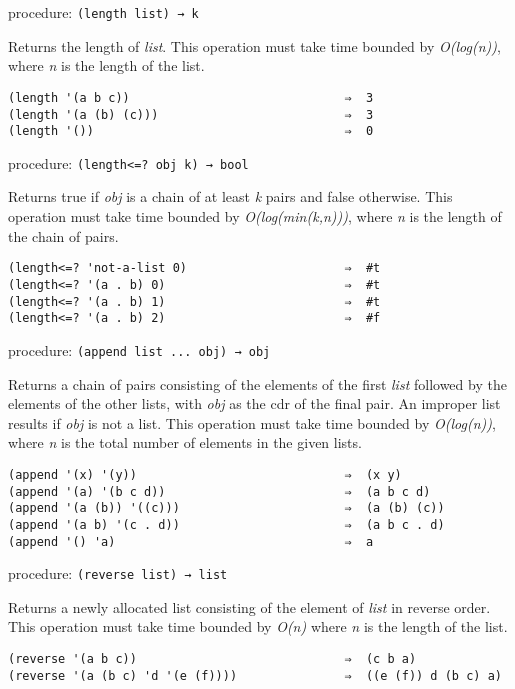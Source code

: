 procedure: \texttt{(length\ list)\ →\ k}

Returns the length of \emph{list}. This operation must take time bounded
by \emph{O(log(n))}, where \emph{n} is the length of the list.

\begin{verbatim}
(length '(a b c))                              ⇒  3
(length '(a (b) (c)))                          ⇒  3
(length '())                                   ⇒  0
\end{verbatim}

procedure: \texttt{(length\textless{}=?\ obj\ k)\ →\ bool}

Returns true if \emph{obj} is a chain of at least \emph{k} pairs and
false otherwise. This operation must take time bounded by
\emph{O(log(min(k,n)))}, where \emph{n} is the length of the chain of
pairs.

\begin{verbatim}
(length<=? 'not-a-list 0)                      ⇒  #t
(length<=? '(a . b) 0)                         ⇒  #t
(length<=? '(a . b) 1)                         ⇒  #t
(length<=? '(a . b) 2)                         ⇒  #f
\end{verbatim}

procedure: \texttt{(append\ list\ ...\ obj)\ →\ obj}

Returns a chain of pairs consisting of the elements of the first
\emph{list} followed by the elements of the other lists, with \emph{obj}
as the cdr of the final pair. An improper list results if \emph{obj} is
not a list. This operation must take time bounded by \emph{O(log(n))},
where \emph{n} is the total number of elements in the given lists.

\begin{verbatim}
(append '(x) '(y))                             ⇒  (x y)
(append '(a) '(b c d))                         ⇒  (a b c d)
(append '(a (b)) '((c)))                       ⇒  (a (b) (c))
(append '(a b) '(c . d))                       ⇒  (a b c . d)
(append '() 'a)                                ⇒  a
\end{verbatim}

procedure: \texttt{(reverse\ list)\ →\ list}

Returns a newly allocated list consisting of the element of \emph{list}
in reverse order. This operation must take time bounded by \emph{O(n)}
where \emph{n} is the length of the list.

\begin{verbatim}
(reverse '(a b c))                             ⇒  (c b a)
(reverse '(a (b c) 'd '(e (f))))               ⇒  ((e (f)) d (b c) a)
\end{verbatim}


